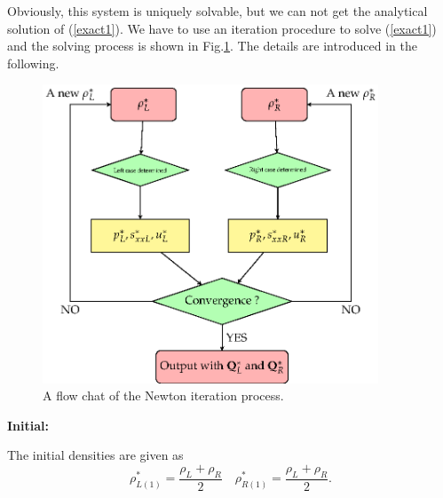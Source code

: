 \documentclass{article}
\numberwithin{equation}{section}
\numberwithin{table}{section}
\begin{document}
Obviously, this system is uniquely solvable, but we can not get the analytical solution of (\ref{exact1}). We have to use an iteration procedure to solve (\ref{exact1}) and
the solving process is shown in Fig.\ref{fig:newton}. The details are introduced in the following.
\begin{figure}
  \centering
  \includegraphics[width= 10cm] {Tikz-figure6.eps}
  \caption{A flow chat of the Newton iteration process.}
  \label{fig:newton}
\end{figure}


\noindent  \textbf{Initial:}

	The initial densities are given as
\begin{equation}
  \rho_{L(1)}^* = \frac{\rho_L+\rho_R}{2} \quad \rho_{R(1)}^* = \frac{\rho_L+\rho_R}{2}.
\end{equation}
\end{document}

